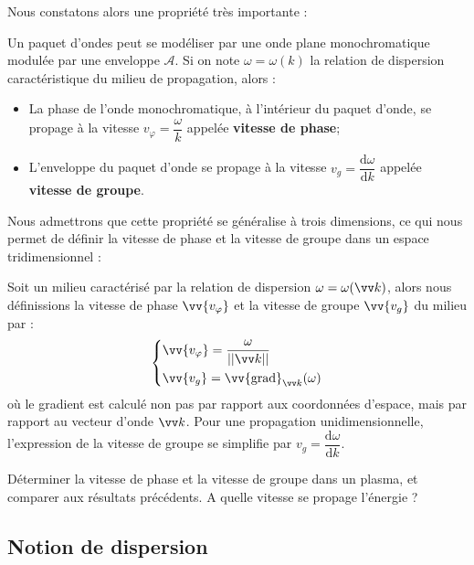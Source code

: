 \documentclass[11pt,fleqn]{book} %
\newcommand{\dd}{\mathrm{d}}
\renewcommand{\grad}{\vv{\mathrm{grad}}}
\begin{document}
Nous constatons alors une propriété très importante :
\begin{theorem}
	Un paquet d'ondes peut se modéliser par une onde plane monochromatique modulée par une enveloppe $\mathcal{A}$. Si on note $\omega = \omega(k)$ la relation de dispersion caractéristique du milieu de propagation, alors :
	\begin{itemize}
		\item La phase de l'onde monochromatique, à l'intérieur du paquet d'onde, se propage à la vitesse $v_\varphi = \dfrac{\omega}{k}$ appelée \textbf{vitesse de phase};
		\item L'enveloppe du paquet d'onde se propage à la vitesse $v_g = \dfrac{\dd \omega}{\dd k}$ appelée \textbf{vitesse de groupe}.
	\end{itemize}
\end{theorem}

Nous admettrons que cette propriété se généralise à trois dimensions, ce qui nous permet de définir la vitesse de phase et la vitesse de groupe dans un espace tridimensionnel :
\begin{definition}
	Soit un milieu caractérisé par la relation de dispersion $\omega = \omega(\vv k)$, alors nous définissions la vitesse de phase $\vv{v_\varphi}$ et la vitesse de groupe $\vv{v_g}$ du milieu par :
	\begin{equation}
		\begin{dcases}
			\vv{v_\varphi} = \dfrac{\omega}{||\vv k||} \\
			\vv{v_g} = \grad_{\vv k}(\omega)
		\end{dcases}
	\end{equation}
	où le gradient est calculé non pas par rapport aux coordonnées d'espace, mais par rapport au vecteur d'onde $\vv k$.
	Pour une propagation unidimensionnelle, l'expression de la vitesse de groupe se simplifie par $v_g = \dfrac{\dd \omega}{\dd k}$.
\end{definition}

\begin{capex}
	Déterminer la vitesse de phase et la vitesse de groupe dans un plasma, et comparer aux résultats précédents. A quelle vitesse se propage l'énergie ?
\end{capex}

\subsection{Notion de dispersion}
\end{document}
